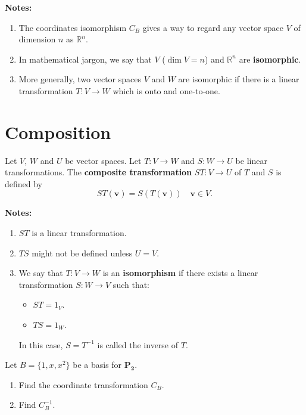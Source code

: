 \documentclass[20pt,a4paper]{extarticle}
\newcommand{\ra}{\rightarrow}
\newcounter{example}
\newcounter{definition}
\begin{document}
\textbf{Notes:}
	\begin{enumerate}[label=\Circled{\arabic*}]
		\item The coordinates isomorphism $C_B$ gives a way to regard any vector space $V$ of dimension $n$ as $\mathbb{R}^n$.
		\item In mathematical jargon, we say that $V$ ($\dim V = n$) and $\mathbb{R}^n$ are \textbf{isomorphic}.
		\item More generally, two vector spaces $V$ and $W$ are isomorphic if there is a linear transformation $T : V \ra W$ which is onto and one-to-one.
	\end{enumerate}

\section{Composition}

\begin{definition}
Let $V$, $W$ and $U$ be vector spaces. Let $T : V \ra W$ and $S : W \ra U$ be linear transformations. The \textbf{composite transformation} $ST : V \ra U$ of $T$ and $S$ is defined by
	\[
		ST (\mathbf{v}) = S (T (\mathbf{v})) \quad \mathbf{v} \in V .
	\]
\end{definition}

\textbf{Notes:}
	\begin{enumerate}[label=\Circled{\arabic*}]
		\item $ST$ is a linear transformation.
		\item $TS$ might not be defined unless $U = V$. 
		\item We say that $T : V \ra W$ is an \textbf{isomorphism} if there exists a linear transformation $S : W \ra V$ such that:
		\begin{multicols}{2}
			\begin{itemize}
				\item $ST = 1_V$.
				\item $TS = 1_W$. 
			\end{itemize}
		\end{multicols}
		In this case, $S = T^{-1}$ is called the inverse of $T$.
	\end{enumerate}

\begin{example}
Let $B = \{ 1 , x, x^2 \}$ be a basis for $\mathbf{P_2}$. 
	\begin{enumerate}[label=\alph*)]
		\item Find the coordinate transformation $C_B$.
		\item Find $C_B^{-1}$.
	\end{enumerate}
\end{example}

\begin{solution}

\end{solution}

\newpage 

\phantom{2}
\end{document}
